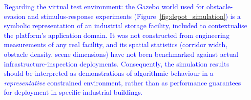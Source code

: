 \documentclass[preprint,12pt]{elsarticle}
\newcommand{\revblue}[1]{\textcolor{blue}{#1}}
\begin{document}

\revblue{%
    Regarding the virtual test environment: the Gazebo world used for
    obstacle-evasion and stimulus-response experiments
    (Figure~\ref{fig:depot_simulation}) is a symbolic representation
    of an industrial storage facility, included to contextualise
    the platform's application domain.
    It was not constructed from engineering measurements of any
    real facility, and its spatial statistics (corridor width,
    obstacle density, scene dimensions) have not been benchmarked
    against actual infrastructure-inspection deployments.
    Consequently, the simulation results should be interpreted as
    demonstrations of algorithmic behaviour in a \emph{representative}
    constrained environment, rather than as performance guarantees
    for deployment in specific industrial buildings.%
}
\end{document}
